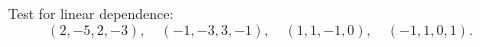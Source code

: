 Test for linear dependence:
$$
(2, -5, 2, -3),\quad (-1, -3, 3, -1),\quad (1, 1, -1, 0),\quad (-1, 1, 0, 1).
$$
